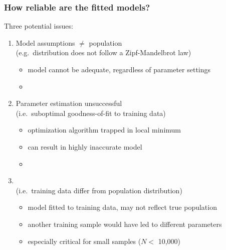 \documentclass[t]{beamer} %
\begin{document}
\begin{frame}
  \frametitle{How reliable are the fitted models?}
  
  Three potential issues:
  \begin{enumerate}
  \item<2-> Model assumptions $\neq$ population\\
    (e.g.\ distribution does not follow a Zipf-Mandelbrot law)
    \begin{itemize}
    \item[\hand] model cannot be adequate, regardless of parameter settings
    \item[]
    \end{itemize}
  \item<3-> Parameter estimation unsuccessful\\
    (i.e.\ suboptimal goodness-of-fit to training data)
    \begin{itemize}
    \item[\hand] optimization algorithm trapped in local minimum
    \item[\hand] can result in highly inaccurate model
    \item[]
    \end{itemize}
  \item<4-> \\
    (i.e.\ training data differ from population distribution)
    \begin{itemize}
    \item[\hand] model fitted to training data, may not reflect true population
    \item[\hand] another training sample would have led to different parameters
    \item[\hand] especially critical for small samples ($N < $ 10,000)
    \end{itemize}
  \end{enumerate}
\end{frame}
\end{document}
